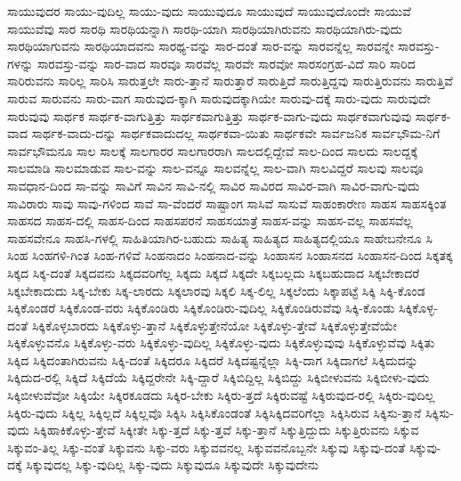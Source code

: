 {ಸಾಯುವುದರ
ಸಾಯು-ವುದಿಲ್ಲ
ಸಾಯು-ವುದು
ಸಾಯುವುದೂ
ಸಾಯುವುದೆ
ಸಾಯುವುದೊಂದೇ
ಸಾಯುವೆ
ಸಾಯುವೆವು
ಸಾರ
ಸಾರಥಿ
ಸಾರಥಿಯನ್ನಾಗಿ
ಸಾರಥಿ-ಯಾಗಿ
ಸಾರಥಿಯಾಗಿರುವನು
ಸಾರಥಿಯಾಗಿರು-ವುದು
ಸಾರಥಿಯಾಗುವನು
ಸಾರಥಿಯಾದವನು
ಸಾರಥ್ಯ-ವನ್ನು
ಸಾರ-ದಂತೆ
ಸಾರ-ವನ್ನು
ಸಾರವನ್ನೆಲ್ಲ
ಸಾರವನ್ನೇ
ಸಾರವಸ್ತು-ಗಳನ್ನು
ಸಾರವಸ್ತು-ವನ್ನು
ಸಾರ-ವಾದ
ಸಾರವೂ
ಸಾರವೆಲ್ಲ
ಸಾರವೇ
ಸಾರವೋ
ಸಾರಸಂಗ್ರಹ-ವಿದೆ
ಸಾರಿ
ಸಾರಿದ
ಸಾರಿರುವನು
ಸಾರಿಲ್ಲ
ಸಾರಿಸಿ
ಸಾರುತ್ತಲೇ
ಸಾರು-ತ್ತಾನೆ
ಸಾರುತ್ತಾರೆ
ಸಾರುತ್ತಿದೆ
ಸಾರುತ್ತಿದ್ದವು
ಸಾರುತ್ತಿರುವನು
ಸಾರುತ್ತಿವೆ
ಸಾರುವ
ಸಾರುವನು
ಸಾರು-ವಾಗ
ಸಾರುವುದ-ಕ್ಕಾಗಿ
ಸಾರುವುದಕ್ಕಾಗಿಯೇ
ಸಾರುವು-ದಕ್ಕೆ
ಸಾರು-ವುದು
ಸಾರುವುದೇ
ಸಾರುವುವು
ಸಾರ್ಥಕ
ಸಾರ್ಥಕ-ವಾಗುತ್ತಿತ್ತು
ಸಾರ್ಥಕವಾಗುತ್ತಿತ್ತು
ಸಾರ್ಥಕ-ವಾಗು-ವುದು
ಸಾರ್ಥಕವಾಗುವುವು
ಸಾರ್ಥಕ-ವಾದ
ಸಾರ್ಥಕ-ವಾದು-ದನ್ನು
ಸಾರ್ಥಕವಾದುದಲ್ಲ
ಸಾರ್ಥಕವಾ-ಯಿತು
ಸಾರ್ಥಕವೇ
ಸಾರ್ವಜನಿಕ
ಸಾರ್ವಭೌಮ-ನಿಗೆ
ಸಾರ್ವಭೌಮನೂ
ಸಾಲ
ಸಾಲಕ್ಕೆ
ಸಾಲಗಾರರ
ಸಾಲಗಾರರಾಗಿ
ಸಾಲದಲ್ಲಿದ್ದೇವೆ
ಸಾಲ-ದಿಂದ
ಸಾಲದು
ಸಾಲದ್ದಕ್ಕೆ
ಸಾಲಮಾಡಿ
ಸಾಲಮಾಡುವ
ಸಾಲ-ವನ್ನು
ಸಾಲ-ವನ್ನೂ
ಸಾಲವನ್ನೆಲ್ಲ
ಸಾಲ-ವಾಗಿ
ಸಾಲವಿದ್ದರೆ
ಸಾಲವು
ಸಾಲವೂ
ಸಾವಧಾನ-ದಿಂದ
ಸಾ-ವನ್ನು
ಸಾವಿಗೆ
ಸಾವಿನ
ಸಾವಿ-ನಲ್ಲಿ
ಸಾವಿರ
ಸಾವಿರದ
ಸಾವಿರ-ವಾಗಿ
ಸಾವಿರ-ವಾಗು-ವುದು
ಸಾವಿರಾರು
ಸಾವು
ಸಾವು-ಗಳಿಂದ
ಸಾವೆ
ಸಾ-ವೆಂದರೆ
ಸಾಷ್ಟಾಂಗ
ಸಾಸಿವೆ
ಸಾಸುವೆ
ಸಾಹಂಕಾರೇಣ
ಸಾಹಸ
ಸಾಹಸಕ್ಕಿಂತ
ಸಾಹಸದ
ಸಾಹಸ-ದಲ್ಲಿ
ಸಾಹಸ-ದಿಂದ
ಸಾಹಸಪರನೆ
ಸಾಹಸಯಾತ್ರೆ
ಸಾಹಸ-ವನ್ನು
ಸಾಹಸ-ವಲ್ಲ
ಸಾಹಸವೆಲ್ಲ
ಸಾಹಸವೇನೂ
ಸಾಹಸಿ-ಗಳಲ್ಲಿ
ಸಾಹಿತಿಯಾಗಿರ-ಬಹುದು
ಸಾಹಿತ್ಯ
ಸಾಹಿತ್ಯದ
ಸಾಹಿತ್ಯದಲ್ಲಿಯೂ
ಸಾಹೇಬನೇನೂ
ಸಿ
ಸಿಂಹ
ಸಿಂಹಗಳಿ-ಗಿಂತ
ಸಿಂಹ-ಗಳಿವೆ
ಸಿಂಹನಾದಂ
ಸಿಂಹನಾದ-ವನ್ನು
ಸಿಂಹಾಸನ
ಸಿಂಹಾಸನದ
ಸಿಂಹಾಸನ-ದಿಂದ
ಸಿಕ್ಕತಕ್ಕ
ಸಿಕ್ಕದ
ಸಿಕ್ಕ-ದಂತೆ
ಸಿಕ್ಕದವನು
ಸಿಕ್ಕದವರಿಗೆಲ್ಲ
ಸಿಕ್ಕದು
ಸಿಕ್ಕದೆ
ಸಿಕ್ಕದೇ
ಸಿಕ್ಕಬಲ್ಲದು
ಸಿಕ್ಕಬಹುದಾದ
ಸಿಕ್ಕಬೇಕಾದರೆ
ಸಿಕ್ಕಬೇಕಾದುದು
ಸಿಕ್ಕ-ಬೇಕು
ಸಿಕ್ಕ-ಲಾರದು
ಸಿಕ್ಕಲಾರವು
ಸಿಕ್ಕಲಿ
ಸಿಕ್ಕ-ಲಿಲ್ಲ
ಸಿಕ್ಕಲೆಂದು
ಸಿಕ್ಕಾಪಟ್ಟೆ
ಸಿಕ್ಕಿ
ಸಿಕ್ಕಿ-ಕೊಂಡ
ಸಿಕ್ಕಿಕೊಂಡರೆ
ಸಿಕ್ಕಿಕೊಂಡ-ವರು
ಸಿಕ್ಕಿಕೊಂಡಿರು
ಸಿಕ್ಕಿಕೊಂಡಿರು-ವುದಿಲ್ಲ
ಸಿಕ್ಕಿಕೊಂಡಿರುವೆವು
ಸಿಕ್ಕಿ-ಕೊಂಡು
ಸಿಕ್ಕಿಕೊಳ್ಳ-ದಂತೆ
ಸಿಕ್ಕಿಕೊಳ್ಳಬಾರದು
ಸಿಕ್ಕಿಕೊಳ್ಳು-ತ್ತಾನೆ
ಸಿಕ್ಕಿಕೊಳ್ಳುತ್ತೇನೆಯೋ
ಸಿಕ್ಕಿಕೊಳ್ಳು-ತ್ತೇವೆ
ಸಿಕ್ಕಿಕೊಳ್ಳುತ್ತೇವೆಯೇ
ಸಿಕ್ಕಿಕೊಳ್ಳುವನೊ
ಸಿಕ್ಕಿಕೊಳ್ಳು-ವರು
ಸಿಕ್ಕಿಕೊಳ್ಳು-ವುದಿಲ್ಲ
ಸಿಕ್ಕಿಕೊಳ್ಳು-ವುದು
ಸಿಕ್ಕಿಕೊಳ್ಳುವುವು
ಸಿಕ್ಕಿಕೊಳ್ಳುವೆವು
ಸಿಕ್ಕಿತು
ಸಿಕ್ಕಿದ
ಸಿಕ್ಕಿದಂತಾಗಿರುವನು
ಸಿಕ್ಕಿ-ದಂತೆ
ಸಿಕ್ಕಿದರೂ
ಸಿಕ್ಕಿದರೆ
ಸಿಕ್ಕಿದಷ್ಟನ್ನೆಲ್ಲಾ
ಸಿಕ್ಕಿ-ದಾಗ
ಸಿಕ್ಕಿದಾಗಲೆ
ಸಿಕ್ಕಿದುದನ್ನು
ಸಿಕ್ಕಿದುದ-ರಲ್ಲಿ
ಸಿಕ್ಕಿದೆ
ಸಿಕ್ಕಿದೆಯೆ
ಸಿಕ್ಕಿದ್ದರೇನೇ
ಸಿಕ್ಕಿ-ದ್ದಾರೆ
ಸಿಕ್ಕಿಬಿದ್ದಿಲ್ಲ
ಸಿಕ್ಕಿಬಿದ್ದು
ಸಿಕ್ಕಿಬೀಳುವನು
ಸಿಕ್ಕಿಬೀಳು-ವುದು
ಸಿಕ್ಕಿಬೀಳುವೆವೋ
ಸಿಕ್ಕಿಯೇ
ಸಿಕ್ಕಿರಕೂಡದು
ಸಿಕ್ಕಿರ-ಬೇಕು
ಸಿಕ್ಕಿರು-ತ್ತದೆ
ಸಿಕ್ಕಿರುವಷ್ಟೆ
ಸಿಕ್ಕಿರುವುದ-ರಲ್ಲಿ
ಸಿಕ್ಕಿರು-ವುದಿಲ್ಲ
ಸಿಕ್ಕಿರು-ವುದು
ಸಿಕ್ಕಿಲ್ಲ
ಸಿಕ್ಕಿಲ್ಲದೆ
ಸಿಕ್ಕಿಲ್ಲವೊ
ಸಿಕ್ಕಿಸಿ
ಸಿಕ್ಕಿಸಿಕೊಂಡಂತೆ
ಸಿಕ್ಕಿಸಿಕ್ಕಿದವರಿಗೆಲ್ಲಾ
ಸಿಕ್ಕಿಸಿರುವ
ಸಿಕ್ಕಿಸು-ತ್ತಾನೆ
ಸಿಕ್ಕಿಸು-ವುದು
ಸಿಕ್ಕಿಹಾಕಿಕೊಳ್ಳು-ತ್ತೇವೆ
ಸಿಕ್ಕೀತೇ
ಸಿಕ್ಕು-ತ್ತದೆ
ಸಿಕ್ಕು-ತ್ತವೆ
ಸಿಕ್ಕು-ತ್ತಾನೆ
ಸಿಕ್ಕುತ್ತಿದ್ದುದು
ಸಿಕ್ಕುತ್ತಿರುವನು
ಸಿಕ್ಕುವ
ಸಿಕ್ಕುವಂ-ತಿಲ್ಲ
ಸಿಕ್ಕು-ವಂತೆ
ಸಿಕ್ಕುವನು
ಸಿಕ್ಕು-ವರು
ಸಿಕ್ಕುವವನಲ್ಲ
ಸಿಕ್ಕುವವನೊಬ್ಬನೇ
ಸಿಕ್ಕುವು
ಸಿಕ್ಕುವು-ದಂತೆ
ಸಿಕ್ಕುವು-ದಕ್ಕೆ
ಸಿಕ್ಕುವುದಲ್ಲ
ಸಿಕ್ಕು-ವುದಿಲ್ಲ
ಸಿಕ್ಕು-ವುದು
ಸಿಕ್ಕುವುದೂ
ಸಿಕ್ಕುವುದೇ
ಸಿಕ್ಕುವುದೇನು
}
